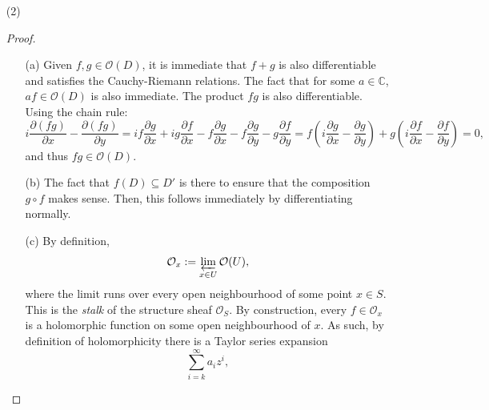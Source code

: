 \documentclass[a4paper]{report}
\theoremstyle{definition}
\theoremstyle{remark}
\theoremstyle{proposition}
\theoremstyle{conjecture}
\theoremstyle{lemma}
\theoremstyle{corollary}
\theoremstyle{exercise}
\theoremstyle{example}
\newcommand{\C}{\mathbb{C}}
\newcommand{\mcal}{\mathcal}
\begin{document}
\begin{enumerate}
\begin{proof}
\begin{itemize}
                    $$\frac{\partial^2f}{\partial x^2} = -i\frac{\partial^2f}{\partial y\partial x}, \quad \frac{\partial^2f}{\partial y^2} = i\frac{\partial^2}{\partial x\partial y},$$
                    and so 
                    $$\Delta(f) = \frac{\partial^2f}{\partial x^2} + \frac{\partial^2f}{\partial y^2} = -i\frac{\partial^2f}{\partial y\partial x} + i \frac{\partial^2f}{\partial x\partial y} = 0,$$
                    as required.
            \end{itemize}
        \end{proof}
    \item[(2)]
        \begin{proof}
            \leavevmode
            \begin{itemize}
                \item[(a)] Given $f,g \in \mcal{O}(D)$, it is immediate that 
                    $f+g$ is also differentiable and satisfies the Cauchy-Riemann
                    relations. 
                    The fact that for some $a\in \C$, $af \in \mcal{O}(D)$ is 
                    also immediate. The product $fg$ is also differentiable.
                    Using the chain rule:
                    $$i\frac{\partial (fg)}{\partial x} - \frac{\partial (fg)}{\partial y} = if\frac{\partial g}{\partial x} + ig\frac{\partial f}{\partial x} -f\frac{\partial g}{\partial x} - f\frac{\partial g}{\partial y} - g\frac{\partial f}{\partial y} = f\left(i\frac{\partial g}{\partial x} - \frac{\partial g}{\partial y}\right) + g\left(i\frac{\partial f}{\partial x}-\frac{\partial f}{\partial y}\right) = 0,$$
                    and thus $fg \in \mcal{O}(D)$. 
                \item[(b)] The fact that $f(D) \subseteq D'$ is there to 
                    ensure that the composition $g\circ f$ makes sense. 
                    Then, this follows immediately by differentiating normally.
                \item[(c)] 
                    By definition, $$\mcal{O}_x := \varprojlim_{x \in U} \mcal{O}(U),$$
                    where the limit runs over every open neighbourhood of 
                    some point $x \in S$. This is the \emph{stalk} of the 
                    structure sheaf $\mcal{O}_S$. By construction, every 
                    $f \in \mcal{O}_x$ is a holomorphic function on some 
                    open neighbourhood of $x$. 
                    As such, by definition of 
                    holomorphicity there is a Taylor series expansion 
                    $$\sum_{i=k}^\infty a_i z^i,$$

\end{itemize}
\end{proof}
\end{enumerate}
\end{document}
